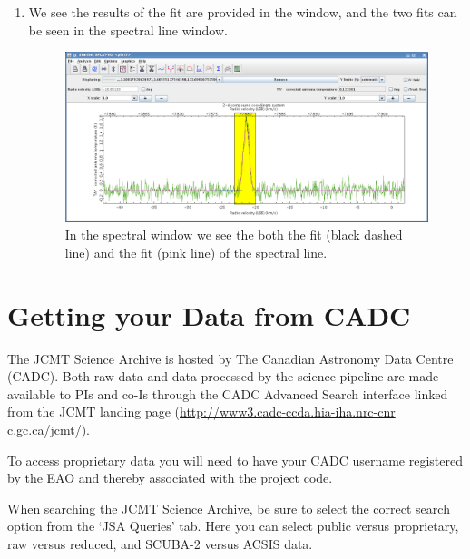 \documentclass[11pt,oneside,chapters]{starlink}
\begin{document}
\begin{enumerate}[label=(\textbf{\arabic*})]
\item We see the results of the fit are provided in the
 window, and the two fits can
be seen in the spectral line window.

\begin{figure}[h!]
\begin{center}
\includegraphics[width=0.9\linewidth]{sc20_splat_fit5}
\caption[Spectrum with fits.]{\label{fig:splat_stats5}
  In the spectral window we see the both the 
  fit (black dashed line) and the  fit
  (pink line) of the spectral line.}
\end{center}
\end{figure}





\end{enumerate}



\clearpage
\chapter{Getting your Data from CADC}
\label{sec:fromcadc}

The JCMT Science Archive is hosted by The Canadian Astronomy Data
Centre (CADC). Both raw data and data processed by the science pipeline
are made available to PIs and co-Is through the CADC Advanced Search
interface linked from the JCMT landing page
(\url{http://www3.cadc-ccda.hia-iha.nrc-cnr c.gc.ca/jcmt/}).

To access proprietary data you will need to have your CADC username
registered by the EAO and thereby associated with the project code.

When searching the JCMT Science Archive, be sure to select the correct
search option from the `JSA Queries' tab. Here you can select public
versus proprietary, raw versus reduced, and SCUBA-2 versus ACSIS data.
\end{document}
